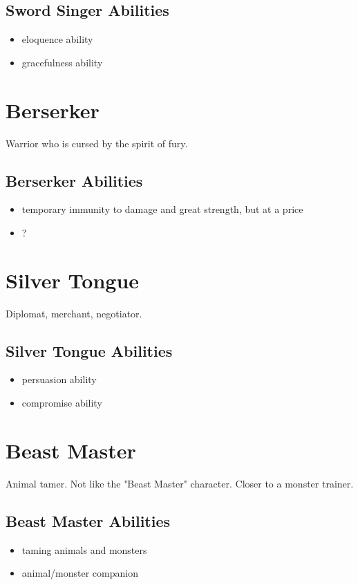 \begin{multicols}{2}
\subsection{Sword Singer Abilities}

\begin{itemize}
    \item eloquence ability
    \item gracefulness ability
\end{itemize}

\section{Berserker}

Warrior who is cursed by the spirit of fury.

\subsection{Berserker Abilities}

\begin{itemize}
    \item temporary immunity to damage and great strength, but at a price
    \item ?
\end{itemize}

\section{Silver Tongue}

Diplomat, merchant, negotiator.

\subsection{Silver Tongue Abilities}

\begin{itemize}
    \item persuasion ability
    \item compromise ability
\end{itemize}

\section{Beast Master}

Animal tamer. Not like the "Beast Master" character. Closer to a monster trainer.

\subsection{Beast Master Abilities}

\begin{itemize}
    \item taming animals and monsters
    \item animal/monster companion
\end{itemize}

\end{multicols}
